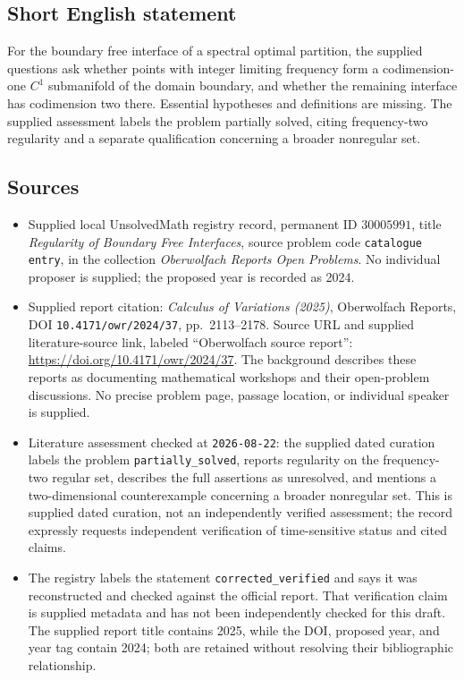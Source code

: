 \documentclass[11pt]{article}
\begin{document}
\subsection{Short English statement}
For the boundary free interface of a spectral optimal partition, the supplied questions ask whether points with integer limiting frequency form a codimension-one \(C^1\) submanifold of the domain boundary, and whether the remaining interface has codimension two there. Essential hypotheses and definitions are missing. The supplied assessment labels the problem partially solved, citing frequency-two regularity and a separate qualification concerning a broader nonregular set.
\subsection{Sources}
\begin{itemize}
\item Supplied local UnsolvedMath registry record, permanent ID \(30005991\), title \emph{Regularity of Boundary Free Interfaces}, source problem code \texttt{catalogue entry}, in the collection \emph{Oberwolfach Reports Open Problems}. No individual proposer is supplied; the proposed year is recorded as 2024.
\item Supplied report citation: \emph{Calculus of Variations (2025)}, Oberwolfach Reports, DOI \texttt{10.4171/owr/2024/37}, pp.\ 2113--2178. Source URL and supplied literature-source link, labeled ``Oberwolfach source report'': \url{https://doi.org/10.4171/owr/2024/37}. The background describes these reports as documenting mathematical workshops and their open-problem discussions. No precise problem page, passage location, or individual speaker is supplied.
\item Literature assessment checked at \texttt{2026-08-22}: the supplied dated curation labels the problem \texttt{partially\_solved}, reports regularity on the frequency-two regular set, describes the full assertions as unresolved, and mentions a two-dimensional counterexample concerning a broader nonregular set. This is supplied dated curation, not an independently verified assessment; the record expressly requests independent verification of time-sensitive status and cited claims.
\item The registry labels the statement \texttt{corrected\_verified} and says it was reconstructed and checked against the official report. That verification claim is supplied metadata and has not been independently checked for this draft. The supplied report title contains 2025, while the DOI, proposed year, and year tag contain 2024; both are retained without resolving their bibliographic relationship.
\end{itemize}
\end{document}
